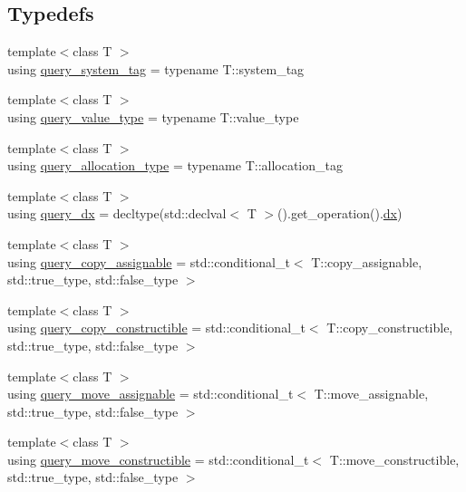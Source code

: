 \subsection*{Typedefs}
\begin{DoxyCompactItemize}
\item 
{\footnotesize template$<$class T $>$ }\\using \hyperlink{namespaceBC_1_1tensors_1_1exprs_1_1detail_a78ddbc90d8902249df20ae15022d9274}{query\+\_\+system\+\_\+tag} = typename T\+::system\+\_\+tag
\item 
{\footnotesize template$<$class T $>$ }\\using \hyperlink{namespaceBC_1_1tensors_1_1exprs_1_1detail_aa067d25adc2a68a08de1456648d9bf2c}{query\+\_\+value\+\_\+type} = typename T\+::value\+\_\+type
\item 
{\footnotesize template$<$class T $>$ }\\using \hyperlink{namespaceBC_1_1tensors_1_1exprs_1_1detail_af7ba0020a7b4a640c05dbf54f8085f29}{query\+\_\+allocation\+\_\+type} = typename T\+::allocation\+\_\+tag
\item 
{\footnotesize template$<$class T $>$ }\\using \hyperlink{namespaceBC_1_1tensors_1_1exprs_1_1detail_afce786a08d3636682dba772cadb7d251}{query\+\_\+dx} = decltype(std\+::declval$<$ T $>$().get\+\_\+operation().\hyperlink{namespaceBC_1_1tensors_a69d386812fe0d7d009849e50bc26e5fe}{dx})
\item 
{\footnotesize template$<$class T $>$ }\\using \hyperlink{namespaceBC_1_1tensors_1_1exprs_1_1detail_a16becd96cbdec2a9f4c4e0354ab5897c}{query\+\_\+copy\+\_\+assignable} = std\+::conditional\+\_\+t$<$ T\+::copy\+\_\+assignable, std\+::true\+\_\+type, std\+::false\+\_\+type $>$
\item 
{\footnotesize template$<$class T $>$ }\\using \hyperlink{namespaceBC_1_1tensors_1_1exprs_1_1detail_a99d9a9b5e8f7821052157b13f034f650}{query\+\_\+copy\+\_\+constructible} = std\+::conditional\+\_\+t$<$ T\+::copy\+\_\+constructible, std\+::true\+\_\+type, std\+::false\+\_\+type $>$
\item 
{\footnotesize template$<$class T $>$ }\\using \hyperlink{namespaceBC_1_1tensors_1_1exprs_1_1detail_af69d3cdb55eeeac2b3d092f14fc2245c}{query\+\_\+move\+\_\+assignable} = std\+::conditional\+\_\+t$<$ T\+::move\+\_\+assignable, std\+::true\+\_\+type, std\+::false\+\_\+type $>$
\item 
{\footnotesize template$<$class T $>$ }\\using \hyperlink{namespaceBC_1_1tensors_1_1exprs_1_1detail_a483b7cde02faa7f11f8c5dda84013764}{query\+\_\+move\+\_\+constructible} = std\+::conditional\+\_\+t$<$ T\+::move\+\_\+constructible, std\+::true\+\_\+type, std\+::false\+\_\+type $>$
\end{DoxyCompactItemize}
